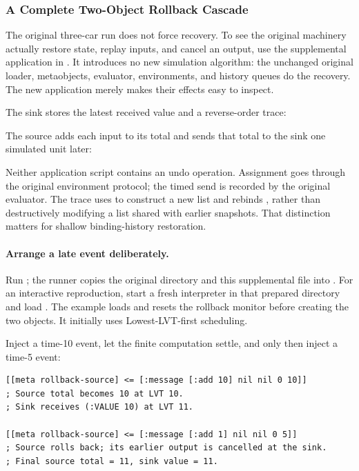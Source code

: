 \subsubsection{A Complete Two-Object Rollback Cascade}
\label{sec:tw-cascade}

The original three-car run does not force recovery. To see the original
machinery actually restore state, replay inputs, and cancel an output,
use the supplemental application in
.
It introduces no new simulation algorithm: the unchanged original
loader, metaobjects, evaluator, environments, and history queues do the
recovery. The new application merely makes their effects easy to inspect.

The sink stores the latest received value and a reverse-order trace:


The source adds each input to its total and sends that total to the sink
one simulated unit later:


Neither application script contains an undo operation. Assignment goes
through the original environment protocol; the timed send is recorded
by the original evaluator. The trace uses  to construct a new
list and rebinds , rather than destructively modifying a list
shared with earlier snapshots. That distinction matters for shallow
binding-history restoration.

\paragraph{Arrange a late event deliberately.}
Run ; the runner copies the
original directory and this supplemental file into
. For an interactive reproduction,
start a fresh interpreter in that prepared directory and load
.
The example loads  and resets the rollback monitor before
creating the two objects. It initially uses Lowest-LVT-first scheduling.

Inject a time-10 event, let the finite computation settle, and only
then inject a time-5 event:

\begin{codeblock}
\begin{lstlisting}
[[meta rollback-source] <= [:message [:add 10] nil nil 0 10]]
; Source total becomes 10 at LVT 10.
; Sink receives (:VALUE 10) at LVT 11.

[[meta rollback-source] <= [:message [:add 1] nil nil 0 5]]
; Source rolls back; its earlier output is cancelled at the sink.
; Final source total = 11, sink value = 11.
\end{lstlisting}
\end{codeblock}


